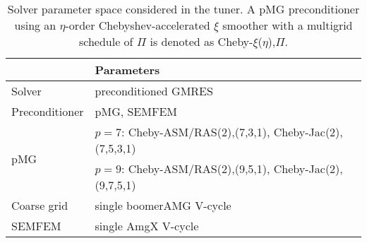 \begin{table}\footnotesize
\centering
\begin{tabular}{|l | l|}
\hline
& Parameters \\
\hline
Solver & preconditioned GMRES\\
\hline
Preconditioner & pMG, SEMFEM \\
\multirow{2}{*}{\hspace*{.15in} pMG} & $p=7$: Cheby-ASM/RAS(2),(7,3,1), Cheby-Jac(2), (7,5,3,1)\\
                                     & $p=9$: Cheby-ASM/RAS(2),(9,5,1), Cheby-Jac(2), (9,7,5,1)\\
\hspace*{0.3in} Coarse grid & single boomerAMG V-cycle\\
\hspace*{.15in} SEMFEM & single AmgX V-cycle\\
\hline
\end{tabular}

\vspace{-0.25cm}
\captionsetup{labelformat=empty}
\caption{
  \small
  Solver parameter space considered in the tuner.
  A pMG preconditioner using an $\eta$-order Chebyshev-accelerated $\xi$ smoother with
  a multigrid schedule of $\Pi$ is denoted as Cheby-$\xi$($\eta$),$\Pi$.
  \label{table:auto-tuner-parameter-space}
}
\end{table}